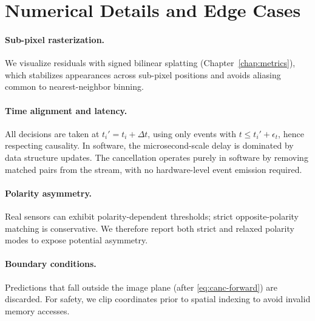 \section{Numerical Details and Edge Cases}
\paragraph{Sub-pixel rasterization.}
We visualize residuals with signed bilinear splatting (Chapter~\ref{chap:metrics}), which stabilizes appearances across sub-pixel positions and avoids aliasing common to nearest-neighbor binning.

\paragraph{Time alignment and latency.}
All decisions are taken at $t_i' = t_i+\Delta t$, using only events with $t\le t_i'+\epsilon_t$, hence respecting causality. In software, the microsecond-scale delay is dominated by data structure updates. The cancellation operates purely in software by removing matched pairs from the stream, with no hardware-level event emission required.

\paragraph{Polarity asymmetry.}
Real sensors can exhibit polarity-dependent thresholds; strict opposite-polarity matching is conservative. We therefore report both strict and relaxed polarity modes to expose potential asymmetry.

\paragraph{Boundary conditions.}
Predictions that fall outside the image plane (after \eqref{eq:canc-forward}) are discarded. For safety, we clip coordinates prior to spatial indexing to avoid invalid memory accesses.

